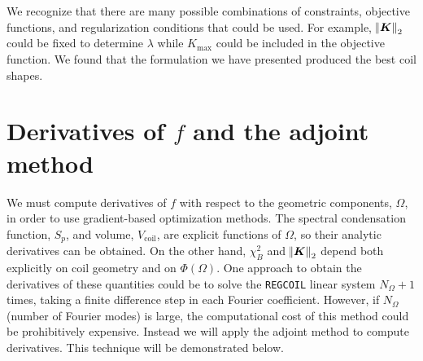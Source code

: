 \documentclass[aps,unsortedaddress]{revtex4-1}
\begin{document}
We recognize that there are many possible combinations of constraints, objective functions, and regularization conditions that could be used. For example, $\norm{\bm{K}}_2$ could be fixed to determine $\lambda$ while $K_{\text{max}}$ could be included in the objective function. We found that the formulation we have presented produced the best coil shapes. 

\section{Derivatives of $f$ and the adjoint method}
\label{sect_adjoint}
We must compute derivatives of $f$ with respect to the geometric components, $\Omega$, in order to use gradient-based optimization methods. The spectral condensation function, $S_p$, and volume, $V_{\text{coil}}$, are explicit functions of $\Omega$, so their analytic derivatives can be obtained. On the other hand, $\chi^2_B$ and $\norm{\bm{K}}_2$ depend both explicitly on coil geometry and on $\Phi(\Omega)$. One approach to obtain the derivatives of these quantities could be to solve the \texttt{REGCOIL} linear system $N_{\Omega} +1$ times, taking a finite difference step in each Fourier coefficient. However, if $N_{\Omega}$ (number of Fourier modes) is large, the computational cost of this method could be prohibitively expensive. Instead we will apply the adjoint method to compute derivatives. This technique will be demonstrated below. 
\end{document}
